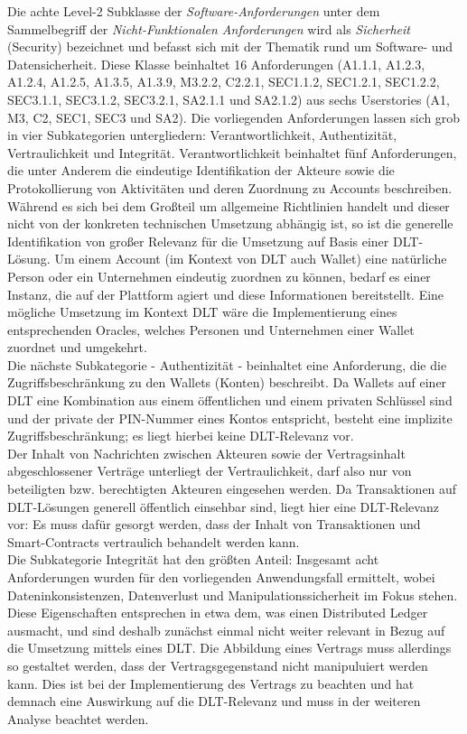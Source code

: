 Die achte Level-2 Subklasse der \textit{Software-Anforderungen} unter dem Sammelbegriff der \textit{Nicht-Funktionalen Anforderungen} wird als \textit{Sicherheit} (Security) bezeichnet und befasst sich mit der Thematik rund um Software- und Datensicherheit. Diese Klasse beinhaltet 16 Anforderungen (A1.1.1, A1.2.3, A1.2.4, A1.2.5, A1.3.5, A1.3.9, M3.2.2, C2.2.1, SEC1.1.2, SEC1.2.1, SEC1.2.2, SEC3.1.1, SEC3.1.2, SEC3.2.1, SA2.1.1 und SA2.1.2) aus sechs Userstories (A1, M3, C2, SEC1, SEC3 und SA2). Die vorliegenden Anforderungen lassen sich grob in vier Subkategorien untergliedern: Verantwortlichkeit, Authentizität, Vertraulichkeit und Integrität. Verantwortlichkeit beinhaltet fünf Anforderungen, die unter Anderem die eindeutige Identifikation der Akteure sowie die Protokollierung von Aktivitäten und deren Zuordnung zu Accounts beschreiben. Während es sich bei dem Großteil um allgemeine Richtlinien handelt und dieser nicht von der konkreten technischen Umsetzung abhängig ist, so ist die generelle Identifikation von großer Relevanz für die Umsetzung auf Basis einer \ac{DLT}-Lösung. Um einem Account (im Kontext von \ac{DLT} auch Wallet) eine natürliche Person oder ein Unternehmen eindeutig zuordnen zu können, bedarf es einer Instanz, die auf der Plattform agiert und diese Informationen bereitstellt. Eine mögliche Umsetzung im Kontext \ac{DLT} wäre die Implementierung eines entsprechenden Oracles, welches Personen und Unternehmen einer Wallet zuordnet und umgekehrt.\\
Die nächste Subkategorie - Authentizität - beinhaltet eine Anforderung, die die Zugriffsbeschränkung zu den Wallets (Konten) beschreibt. Da Wallets auf einer \ac{DLT} eine Kombination aus einem öffentlichen und einem privaten Schlüssel sind und der private der PIN-Nummer eines Kontos entspricht, besteht eine implizite Zugriffsbeschränkung; es liegt hierbei keine \ac{DLT}-Relevanz vor.\\
Der Inhalt von Nachrichten zwischen Akteuren sowie der Vertragsinhalt abgeschlossener Verträge unterliegt der Vertraulichkeit, darf also nur von beteiligten bzw. berechtigten Akteuren eingesehen werden. Da Transaktionen auf \ac{DLT}-Lösungen generell öffentlich einsehbar sind, liegt hier eine \ac{DLT}-Relevanz vor: Es muss dafür gesorgt werden, dass der Inhalt von Transaktionen und Smart-Contracts vertraulich behandelt werden kann.\\
Die Subkategorie Integrität hat den größten Anteil: Insgesamt acht Anforderungen wurden für den vorliegenden Anwendungsfall ermittelt, wobei Dateninkonsistenzen, Datenverlust und Manipulationssicherheit im Fokus stehen. Diese Eigenschaften entsprechen in etwa dem, was einen Distributed Ledger ausmacht, und sind deshalb zunächst einmal nicht weiter relevant in Bezug auf die Umsetzung mittels eines \ac{DLT}. Die Abbildung eines Vertrags muss allerdings so gestaltet werden, dass der Vertragsgegenstand nicht manipuluiert werden kann. Dies ist bei der Implementierung des Vertrags zu beachten und hat demnach eine Auswirkung auf die \ac{DLT}-Relevanz und muss in der weiteren Analyse beachtet werden.


